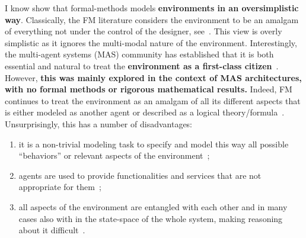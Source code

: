 \documentclass[a4paper,10pt]{article}
\begin{document}
I know show that formal-methods models \textbf{environments in an oversimplistic way}. 
Classically, the FM literature considers the environment to be an amalgam of everything not under the control of the designer, see~\cite{FHMV95,PnRo89,HMC17}. 
This view is {overly simplistic} as it ignores the multi-modal nature of the environment. 
Interestingly, the multi-agent systems (MAS) community has established that it is both essential
and natural to treat the \textbf{environment as a first-class citizen}~\cite{DBLP:journals/aamas/WeynsOO07,DBLP:conf/aose/OdellPFB02}.
However, \textbf{this was mainly explored in the context of MAS architectures, with no
formal methods or rigorous mathematical results.} \label{monolithic} 
Indeed, FM continues to treat the environment as an amalgam of all its different aspects that is either 
modeled as another agent or described as a logical theory/formula~\cite{PnRo89,reiter2001knowledge}. 
Unsurprisingly, this has a number of disadvantages:
\begin{enumerate}
 \item  it is a non-trivial
modeling task to specify and model this way all possible ``behaviors'' or relevant
aspects of the environment~\cite{Lin14}; 
\item agents are used to provide
functionalities and services that are not appropriate for them~\cite{DBLP:journals/aamas/WeynsOO07};
\item all aspects of the environment are entangled with each other and in many cases also with
in the state-space of the whole system, making reasoning about it difficult~\cite{DBLP:journals/aamas/WeynsOO07}.
\end{enumerate}
\end{document}
